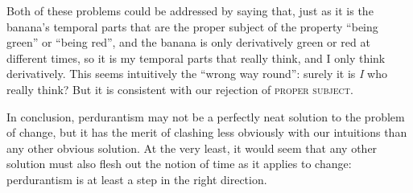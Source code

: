 \documentclass[english]{scrartcl}
\newcommand{\law}[1]{\textsc{#1}}
\begin{document}
Both of these problems could be addressed by saying that, just as it is the banana’s temporal parts that are the proper subject of the property “being green” or “being red”, and the banana is only derivatively green or red at different times, so it is my temporal parts that really think, and I only think derivatively. This seems intuitively the “wrong way round”: surely it is \emph{I} who really think? But it is consistent with our rejection of \law{proper subject}.

In conclusion, perdurantism may not be a perfectly neat solution to the problem of change, but it has the merit of clashing less obviously with our intuitions than any other obvious solution. At the very least, it would seem that any other solution must also flesh out the notion of time as it applies to change: perdurantism is at least a step in the right direction.





\end{document}
